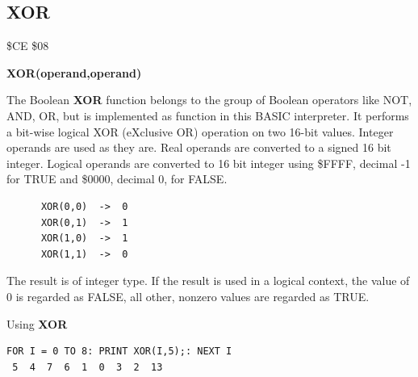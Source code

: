 \subsection{XOR}
\begin{description}[leftmargin=2cm,style=nextline]
\item [Token:] \$CE \$08
\item [Format:] {\bf XOR(operand,operand)}
\item [Usage:]  The Boolean {\bf XOR} function belongs to the group
                of Boolean operators like NOT, AND, OR, but is
                implemented as function in this BASIC interpreter.
                It  performs a bit-wise
                logical XOR (eXclusive OR) operation on two 16-bit values.
                Integer operands are used as they are.
                Real operands are converted to a signed 16 bit integer.
                Logical operands are converted to 16 bit integer
                using \$FFFF, decimal -1 for TRUE
                and \$0000, decimal 0, for FALSE.

   \begin{verbatim}
      XOR(0,0)  ->  0
      XOR(0,1)  ->  1
      XOR(1,0)  ->  1
      XOR(1,1)  ->  0
   \end{verbatim}

\item [Remarks:] The result is of integer type.
                 If the result is used in a logical context,
                 the value of 0 is regarded as FALSE,
                 all other, nonzero values are regarded as TRUE.
\item [Example:] Using {\bf XOR}

\begin{tcolorbox}[colback=black,coltext=white]
\verbatimfont{\codefont}
\begin{verbatim}
FOR I = 0 TO 8: PRINT XOR(I,5);: NEXT I
 5  4  7  6  1  0  3  2  13
\end{verbatim}
\end{tcolorbox}
\end{description}

